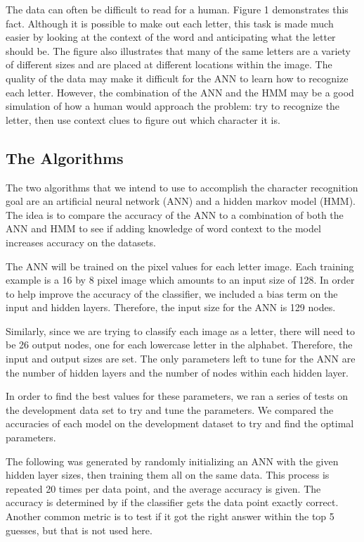 \documentclass[11pt,a4paper,twocolumn]{article}
\begin{document}
The data can often be difficult to read for a human. Figure 1 demonstrates this fact. Although it is possible to make out each letter, this task is made much easier by looking at the context of the word and anticipating what the letter should be. The figure also illustrates that many of the same letters are a variety of different sizes and are placed at different locations within the image. The quality of the data may make it difficult for the ANN to learn how to recognize each letter. However, the combination of the ANN and the HMM may be a good simulation of how a human would approach the problem: try to recognize the letter, then use context clues to figure out which character it is.

\subsection*{The Algorithms}

The two algorithms that we intend to use to accomplish the character recognition goal are an artificial neural network (ANN) and a hidden markov model (HMM). The idea is to compare the accuracy of the ANN to a combination of both the ANN and HMM to see if adding knowledge of word context to the model increases accuracy on the datasets.

The ANN will be trained on the pixel values for each letter image. Each training example is a 16 by 8 pixel image which amounts to an input size of 128. In order to help improve the accuracy of the classifier, we included a bias term on the input and hidden layers. Therefore, the input size for the ANN is 129 nodes.

Similarly, since we are trying to classify each image as a letter, there will need to be 26 output nodes, one for each lowercase letter in the alphabet. Therefore, the input and output sizes are set. The only parameters left to tune for the ANN are the number of hidden layers and the number of nodes within each hidden layer.

In order to find the best values for these parameters, we ran a series of tests on the development data set to try and tune the parameters. We compared the accuracies of each model on the development dataset to try and find the optimal parameters.

The following was generated by randomly initializing an ANN with the given hidden layer sizes, then training them all on the same data. This process is repeated 20 times per data point, and the average accuracy is given. The accuracy is determined by if the classifier gets the data point exactly correct. Another common metric is to test if it got the right answer within the top 5 guesses, but that is not used here.
\end{document}

